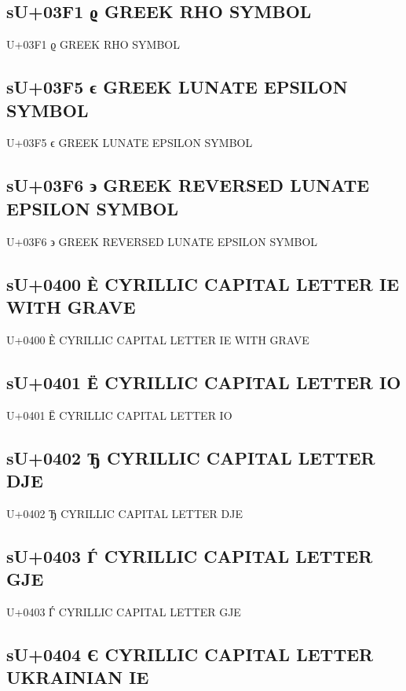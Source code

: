 \subsection{sU+03F1 ϱ GREEK RHO SYMBOL}

U+03F1 ϱ GREEK RHO SYMBOL

\subsection{sU+03F5 ϵ GREEK LUNATE EPSILON SYMBOL}

U+03F5 ϵ GREEK LUNATE EPSILON SYMBOL

\subsection{sU+03F6 ϶ GREEK REVERSED LUNATE EPSILON SYMBOL}

U+03F6 ϶ GREEK REVERSED LUNATE EPSILON SYMBOL

\fi
\iftestcyr

\subsection{sU+0400 Ѐ  CYRILLIC CAPITAL LETTER IE WITH GRAVE}

U+0400 Ѐ  CYRILLIC CAPITAL LETTER IE WITH GRAVE

\subsection{sU+0401 Ё  CYRILLIC CAPITAL LETTER IO}

U+0401 Ё  CYRILLIC CAPITAL LETTER IO

\subsection{sU+0402 Ђ  CYRILLIC CAPITAL LETTER DJE}

U+0402 Ђ  CYRILLIC CAPITAL LETTER DJE

\subsection{sU+0403 Ѓ  CYRILLIC CAPITAL LETTER GJE}

U+0403 Ѓ  CYRILLIC CAPITAL LETTER GJE

\subsection{sU+0404 Є  CYRILLIC CAPITAL LETTER UKRAINIAN IE}

